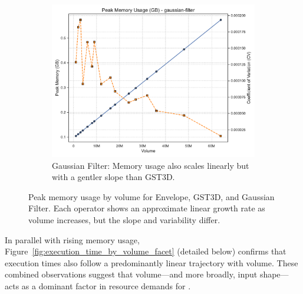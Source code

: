 \begin{figure}[htbp]
\begin{subfigure}[t]{0.49\textwidth}
    \end{subfigure}
    \hfill
    \begin{subfigure}[t]{0.49\textwidth}
        \centering
        \includegraphics[width=\textwidth]{assets/images/05/peak_memory_by_volume_gaussian-filter}
        \caption{Gaussian Filter: Memory usage also scales linearly but with a gentler slope than \ac{GST3D}.}
    \end{subfigure}
    \caption{Peak memory usage by volume for Envelope, \ac{GST3D}, and Gaussian Filter. 
        Each operator shows an approximate linear growth rate as volume increases, but the slope and variability differ.
    }
    \label{fig:peak_memory_facet}
\end{figure}

In parallel with rising memory usage, Figure~\ref{fig:execution_time_by_volume_facet} (detailed below) confirms that execution times also follow a predominantly linear trajectory with volume.
These combined observations suggest that volume—and more broadly, input shape—acts as a dominant factor in resource demands for .

